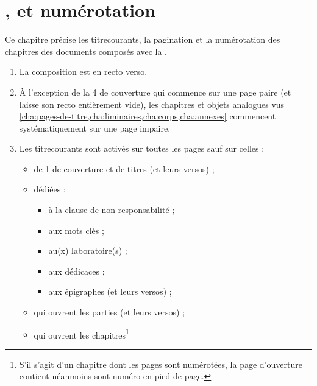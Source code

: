 \chapter{\texorpdfstring{}{Titres courants},  et numérotation}\label{cha:pagination}

Ce chapitre précise les \glspl{titrecourant}, la \gls{pagination} et la
numérotation des chapitres des documents composés avec la \yatcl{}.

\begin{enumerate}
\item La composition est en recto verso\exceptoneside.
\item À l'exception de la 4\ieme{} de couverture qui commence sur une page
  paire (et laisse son recto entièrement vide), les chapitres et objets
  analogues vus \vref{cha:pages-de-titre,cha:liminaires,cha:corps,cha:annexes}
  commencent systématiquement sur une page impaire\exceptoneside.
\item Les \glspl{titrecourant} sont activés sur toutes les pages sauf sur
  celles :
  \begin{itemize}
  \item de 1\iere{} de couverture et de titres (et leurs versos) ;
  \item dédiées :
    \begin{itemize}
    \item à la clause de non-responsabilité ;
    \item aux mots clés ;
    \item au(x) laboratoire(s) ;
    \item aux dédicaces ;
    \item aux épigraphes (et leurs versos) ;
    \end{itemize}
  \item qui ouvrent les parties (et leurs versos) ;
  \item qui ouvrent les chapitres\footnote{%
      S'il s'agit d'un chapitre dont les pages sont numérotées, la page
      d'ouverture contient néanmoins sont numéro en pied de page.%
}
\end{itemize}
\end{enumerate}
